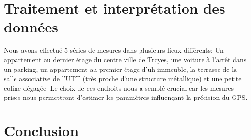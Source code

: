 \documentclass[a4paper,12pt]{article}
\begin{document}
\section{Traitement et interprétation des données}
Nous avons effectué 5 séries de mesures dans plusieurs lieux différents: Un appartement au dernier étage du centre ville de Troyes, une voiture à l'arrêt dans un parking, un appartement au premier étage d'uh immeuble, la terrasse de la salle associative de l'UTT (très proche d'une structure métallique) et une petite coline dégagée.
Le choix de ces endroits nous a semblé crucial car les mesures prises nous permettront d'estimer les paramètres influençant la précision du GPS.


\section*{Conclusion}
\end{document}
